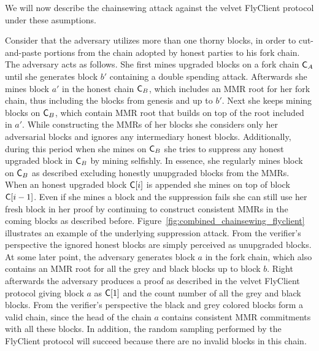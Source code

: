 	We will now describe the chainsewing attack against the velvet FlyClient protocol under these asumptions.

	Consider that the adversary utilizes more than one thorny blocks, in order to cut-and-paste portions from the chain adopted by honest parties to his fork chain. 
    The adversary acts as follows. 
    She first mines upgraded blocks on a fork chain $\mathsf{C}_A$ until she generates block $b'$ containing a double spending attack. 
    Afterwards she mines block $a'$ in the honest chain $\mathsf{C}_B$, which includes an MMR root for her fork chain, thus including the blocks from genesis and up to $b'$. 
    Next she keeps mining blocks on $\mathsf{C}_B$, which contain MMR root that builds on top of the root included in $a'$. While constructing the MMRs of her blocks she considers only her 
    adversarial blocks and ignores any intermediary honest blocks. 
    Additionally, during this period when she mines on $\mathsf{C}_B$ she tries to suppress any honest upgraded block in $\mathsf{C}_B$ by mining selfishly. 
    In essence, she regularly mines block on $\mathsf{C}_B$ as described excluding honestly unupgraded blocks from the MMRs. 
    When an honest upgraded block $\mathsf{C}[i]$ is appended she mines on top of block $\mathsf{C}[i-1]$. 
    Even if she mines a block and the suppression fails she can still use her fresh block in her proof by continuing to construct consistent MMRs 
    in the coming blocks as described before. Figure~\ref{fig:combined_chainsewing_flyclient} illustrates an example of the underlying suppression attack.
	From the verifier's perspective the ignored honest blocks are simply perceived as unupgraded blocks. At some later point, the adversary generates block $a$ 
    in the fork chain, which also contains an MMR root for all the grey and black blocks up to block $b$. 
    Right afterwards the adversary produces a proof as described in the velvet FlyClient protocol giving block $a$ as $\mathsf{C}[1]$ 
    and the count number of all the grey and black blocks. From the verifier's perspective the black and grey colored blocks form a valid chain, 
    since the head of the chain $a$ contains consistent MMR commitments with all these blocks. 
    In addition, the random sampling performed by the FlyClient protocol will succeed because there are no invalid blocks in this chain.


